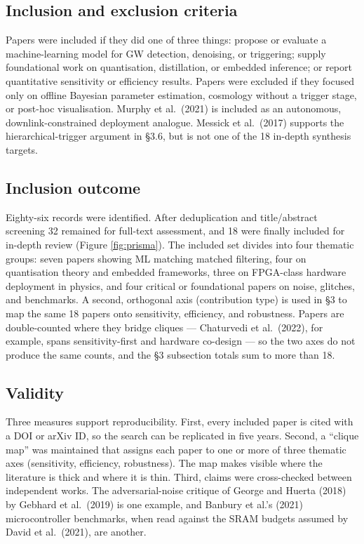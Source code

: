 \documentclass[11pt,a4paper]{article}
\begin{document}
\subsection{Inclusion and exclusion criteria}
Papers were included if they did one of three things: propose or evaluate a machine-learning model for GW detection, denoising, or triggering; supply foundational work on quantisation, distillation, or embedded inference; or report quantitative sensitivity or efficiency results. Papers were excluded if they focused only on offline Bayesian parameter estimation, cosmology without a trigger stage, or post-hoc visualisation. Murphy et al.\ (2021) is included as an autonomous, downlink-constrained deployment analogue. Messick et al.\ (2017) supports the hierarchical-trigger argument in §3.6, but is not one of the 18 in-depth synthesis targets.

\subsection{Inclusion outcome}
Eighty-six records were identified. After deduplication and title/abstract screening 32 remained for full-text assessment, and 18 were finally included for in-depth review (Figure \ref{fig:prisma}). The included set divides into four thematic groups: seven papers showing ML matching matched filtering, four on quantisation theory and embedded frameworks, three on FPGA-class hardware deployment in physics, and four critical or foundational papers on noise, glitches, and benchmarks. A second, orthogonal axis (contribution type) is used in §3 to map the same 18 papers onto sensitivity, efficiency, and robustness. Papers are double-counted where they bridge cliques — Chaturvedi et al.\ (2022), for example, spans sensitivity-first and hardware co-design — so the two axes do not produce the same counts, and the §3 subsection totals sum to more than 18.

\subsection{Validity}
Three measures support reproducibility. First, every included paper is cited with a DOI or arXiv ID, so the search can be replicated in five years. Second, a ``clique map'' was maintained that assigns each paper to one or more of three thematic axes (sensitivity, efficiency, robustness). The map makes visible where the literature is thick and where it is thin. Third, claims were cross-checked between independent works. The adversarial-noise critique of George and Huerta (2018) by Gebhard et al.\ (2019) is one example, and Banbury et al.'s (2021) microcontroller benchmarks, when read against the SRAM budgets assumed by David et al.\ (2021), are another.
\end{document}
